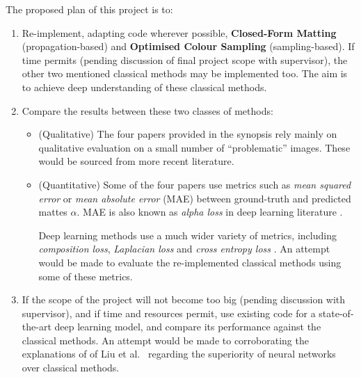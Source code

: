 \documentclass{article}
\begin{document}
The proposed plan of this project is to:
\begin{enumerate}[label=\arabic*.]
    \item Re-implement, adapting code wherever possible, \textbf{Closed-Form Matting} (propagation-based) and \textbf{Optimised Colour Sampling} (sampling-based). If time permits (pending discussion of final project scope with supervisor), the other two mentioned classical methods may be implemented too. The aim is to achieve deep understanding of these classical methods.
    \item Compare the results between these two classes of methods:
    \begin{itemize}
        \item (Qualitative) The four papers provided in the synopsis \cite{bayesian-matting, robust-matting, poisson-matting, closed-form-matting} rely mainly on qualitative evaluation on a small number of ``problematic'' images. These would be sourced from more recent literature.
        \item (Quantitative) Some of the four papers use metrics such as \emph{mean squared error} or \emph{mean absolute error} (MAE) between ground-truth and predicted mattes $\alpha$. MAE is also known as \emph{alpha loss} in deep learning literature \cite{dnn-survey}.

        Deep learning methods use a much wider variety of metrics, including \emph{composition loss}, \emph{Laplacian loss} and \emph{cross entropy loss} \cite{dnn-survey}. An attempt would be made to evaluate the re-implemented classical methods using some of these metrics.
    \end{itemize}
    \item If the scope of the project will not become too big (pending discussion with supervisor), and if time and resources permit, use existing code for a state-of-the-art deep learning model, and compare its performance against the classical methods. An attempt would be made to corroborating the explanations of of Liu et al.\ \cite{sota-composition-1k} regarding the superiority of neural networks over classical methods.
\end{enumerate}

%
\end{document}
